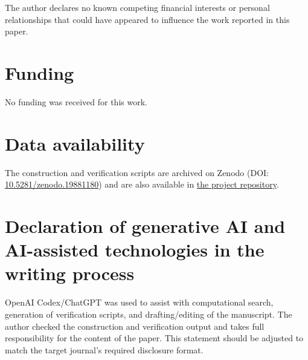 \documentclass[preprint,12pt]{elsarticle}
\begin{document}
The author declares no known competing financial interests or personal
relationships that could have appeared to influence the work reported in this
paper.

\section*{Funding}

No funding was received for this work.

\section*{Data availability}

The construction and verification scripts are archived on Zenodo
(DOI: \href{https://doi.org/10.5281/zenodo.19881180}{10.5281/zenodo.19881180})
and are also available in
\href{https://github.com/dmzlxm/q6-k33-factorization}{the project repository}.

\section*{Declaration of generative AI and AI-assisted technologies in the writing process}

OpenAI Codex/ChatGPT was used to assist with computational search, generation
of verification scripts, and drafting/editing of the manuscript. The author
checked the construction and verification output and takes full responsibility
for the content of the paper. This statement should be adjusted to match the
target journal's required disclosure format.
\end{document}
